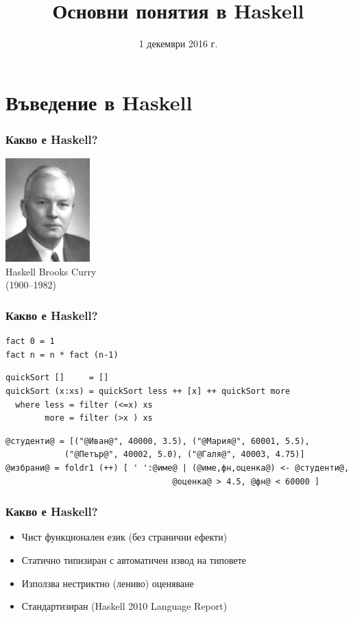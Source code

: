 \documentclass{beamer}
\title{Основни понятия в Haskell}
\date{1 декември 2016 г.}
\begin{document}
\begin{frame}
  \titlepage
\end{frame}

\section{Въведение в Haskell}

\begin{frame}
  \frametitle{Какво е Haskell?}

  \pause
  \begin{center}
    \includegraphics[height=4cm]{images/HaskellBCurry.jpg}\\
    Haskell Brooks Curry\\
    (1900--1982)
  \end{center}
\end{frame}

\lstset{basicstyle=\small\ttfamily}

\begin{frame}[fragile]
  \frametitle{Какво е Haskell?}

  \pause
\begin{lstlisting}
fact 0 = 1
fact n = n * fact (n-1)
\end{lstlisting}
  \pause
\begin{lstlisting}
quickSort []     = []
quickSort (x:xs) = quickSort less ++ [x] ++ quickSort more
  where less = filter (<=x) xs
        more = filter (>x ) xs
\end{lstlisting}
  \pause
\begin{lstlisting}
@студенти@ = [("@Иван@", 40000, 3.5), ("@Мария@", 60001, 5.5),
            ("@Петър@", 40002, 5.0), ("@Галя@", 40003, 4.75)]
@избрани@ = foldr1 (++) [ ' ':@име@ | (@име,фн,оценка@) <- @студенти@,
                                  @оценка@ > 4.5, @фн@ < 60000 ]
\end{lstlisting}
\end{frame}

\lstset{basicstyle=\ttfamily}

\begin{frame}
  \frametitle{Какво е Haskell?}

  \pause
  \begin{itemize}
  \item Чист функционален език (без странични ефекти)
  \item Статично типизиран с автоматичен извод на типовете
  \item Използва нестриктно (лениво) оценяване
  \item Стандартизиран (Haskell 2010 Language Report)
  \end{itemize}
\end{frame}
\end{document}
